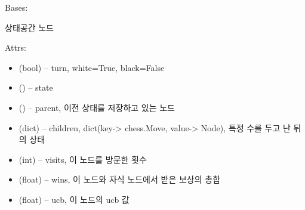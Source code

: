 \documentclass[letterpaper,10pt,english]{sphinxmanual}
\begin{document}
\begin{fulllineitems}
\label{\detokenize{agents.self_learning:agents.self_learning.mcts.Node}}
Bases: 

상태공간 노드

Attrs:
\begin{itemize}
\item {} 
(bool) -- turn, white=True, black=False

\item {} 
({\hyperref[\detokenize{scripts:scripts.run_game.State}]{}}) -- state

\item {} 
({\hyperref[\detokenize{agents.self_learning:agents.self_learning.mcts.Node}]{}}) -- parent, 이전 상태를 저장하고 있는 노드

\item {} 
(dict) -- children, dict(key-\textgreater{} chess.Move, value-\textgreater{} Node), 특정 수를 두고 난 뒤의 상태

\item {} 
(int) -- visits, 이 노드를 방문한 횟수

\item {} 
(float) -- wins, 이 노드와 자식 노드에서 받은 보상의 총합

\item {} 
(float) -- ucb, 이 노드의 ucb 값

\end{itemize}

\begin{fulllineitems}
\label{\detokenize{agents.self_learning:agents.self_learning.mcts.Node.children}}
\end{fulllineitems}


\begin{fulllineitems}
\label{\detokenize{agents.self_learning:agents.self_learning.mcts.Node.key}}
\end{fulllineitems}


\end{fulllineitems}
\end{document}
